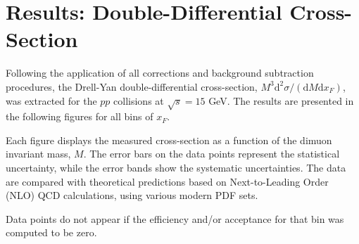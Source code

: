 \documentclass[11pt]{article}
\newcommand{\diffd}{\mathrm{d}}
\begin{document}
\section{Results: Double-Differential Cross-Section}
\label{sec:results}
Following the application of all corrections and background subtraction procedures, the Drell-Yan double-differential cross-section, $M^3 \diffd^2\sigma / (\diffd M \diffd x_F)$, was extracted for the $pp$ collisions at $\sqrt{s} = 15$ GeV. The results are presented in the following figures for all bins of $x_F$.

Each figure displays the measured cross-section as a function of the dimuon invariant mass, $M$. The error bars on the data points represent the statistical uncertainty, while the error bands show the systematic uncertainties. The data are compared with theoretical predictions based on Next-to-Leading Order (NLO) QCD calculations, using various modern PDF sets.

Data points do not appear if the efficiency and/or acceptance for that bin was computed to be zero.
\end{document}

